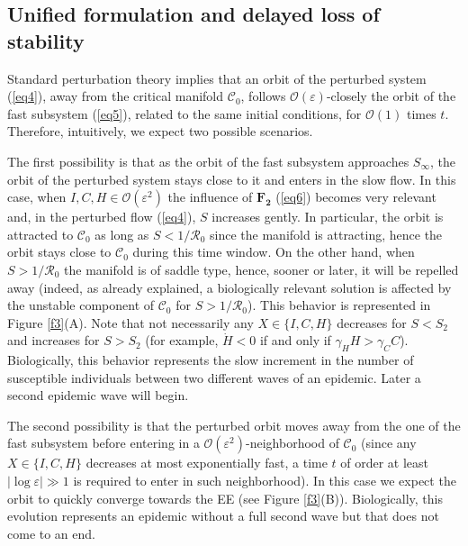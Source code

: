 \documentclass[11pt,reqno]{amsart}
\theoremstyle{boldremark}
\begin{document}
\subsection{Unified formulation and delayed loss of stability}

\noindent Standard perturbation theory \cite[Corollary 3.1.7]{2} implies that an orbit of the perturbed system (\ref{eq4}), away from the critical manifold $\mathcal{C}_0$, follows $\mathcal{O}(\varepsilon)$-closely the orbit of the fast subsystem (\ref{eq5}), related to the same initial conditions, for $\mathcal{O}(1)$ times $t$. Therefore, intuitively, we expect two possible scenarios. 

The first possibility is that as the orbit of the fast subsystem approaches $S_\infty$, the orbit of the perturbed system stays close to it and enters in the slow flow. In this case, when $I, C,H \in \mathcal{O}(\varepsilon^2)$ the influence of $\mathbf{F_2}$ (\ref{eq6}) becomes very relevant and, in the perturbed flow (\ref{eq4}), $S$ increases gently. In particular, the orbit is attracted to $\mathcal{C}_0$ as long as $S<1/\mathcal{R}_0$ since the manifold is attracting, hence the orbit stays close to $\mathcal{C}_0$ during this time window. On the other hand, when $S>1/\mathcal{R}_0$ the manifold is of saddle type, hence, sooner or later, it will be repelled away (indeed, as already explained, a biologically relevant solution is affected by the unstable component of $\mathcal{C}_0$ for $S>1/\mathcal{R}_0$). This behavior is represented in Figure \ref{f3}(A). Note that not necessarily any $X\in\{I,C,H\}$ decreases for $S<S_2$ and increases for $S>S_2$ (for example, $\dot{H}<0$ if and only if $\gamma_H H > \gamma_C C$). Biologically, this behavior represents the slow increment in the number of susceptible individuals between two different waves of an epidemic. Later a second epidemic wave will begin. 

The second possibility is that the perturbed orbit moves away from the one of the fast subsystem before entering in a $\mathcal{O}(\varepsilon^2)$-neighborhood of $\mathcal{C}_0$ (since any $X\in\{I,C,H\}$ decreases at most exponentially fast, a time $t$ of order at least $|\log \varepsilon| \gg 1$ is required to enter in such neighborhood). In this case we expect the orbit to quickly converge towards the EE (see Figure \ref{f3}(B)). Biologically, this evolution represents an epidemic without a full second wave but that does not come to an end. 
\end{document}
